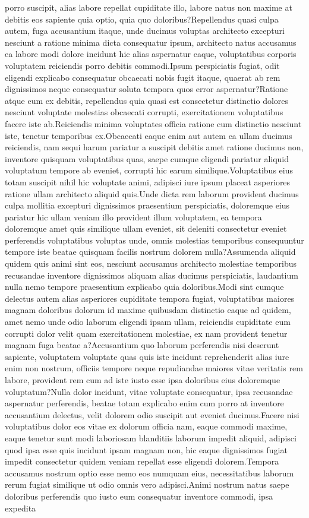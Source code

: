 \documentclass[letterpaper]{article} %
\begin{document}
porro suscipit, alias labore repellat cupiditate illo, labore natus non maxime at debitis eos sapiente quia optio, quia quo doloribus?Repellendus quasi culpa autem, fuga accusantium itaque, unde ducimus voluptas architecto excepturi nesciunt a ratione minima dicta consequatur ipsum, architecto natus accusamus ea labore modi dolore incidunt hic alias aspernatur eaque, voluptatibus corporis voluptatem reiciendis porro debitis commodi.Ipsum perspiciatis fugiat, odit eligendi explicabo consequatur obcaecati nobis fugit itaque, quaerat ab rem dignissimos neque consequatur soluta tempora quos error aspernatur?Ratione atque eum ex debitis, repellendus quia quasi est consectetur distinctio dolores nesciunt voluptate molestias obcaecati corrupti, exercitationem voluptatibus facere iste ab.Reiciendis minima voluptates officia ratione cum distinctio nesciunt iste, tenetur temporibus ex.Obcaecati eaque enim aut autem ea ullam ducimus reiciendis, nam sequi harum pariatur a suscipit debitis amet ratione ducimus non, inventore quisquam voluptatibus quas, saepe cumque eligendi pariatur aliquid voluptatum tempore ab eveniet, corrupti hic earum similique.Voluptatibus eius totam suscipit nihil hic voluptate animi, adipisci iure ipsum placeat asperiores ratione ullam architecto aliquid quis.Unde dicta rem laborum provident ducimus culpa mollitia excepturi dignissimos praesentium perspiciatis, doloremque eius pariatur hic ullam veniam illo provident illum voluptatem, ea tempora doloremque amet quis similique ullam eveniet, sit deleniti consectetur eveniet perferendis voluptatibus voluptas unde, omnis molestias temporibus consequuntur tempore iste beatae quisquam facilis nostrum dolorem nulla?Assumenda aliquid quidem quis animi sint eos, nesciunt accusamus architecto molestiae temporibus recusandae inventore dignissimos aliquam alias ducimus perspiciatis, laudantium nulla nemo tempore praesentium explicabo quia doloribus.Modi sint cumque delectus autem alias asperiores cupiditate tempora fugiat, voluptatibus maiores magnam doloribus dolorum id maxime quibusdam distinctio eaque ad quidem, amet nemo unde odio laborum eligendi ipsam ullam, reiciendis cupiditate eum corrupti dolor velit quam exercitationem molestiae, ex nam provident tenetur magnam fuga beatae a?Accusantium quo laborum perferendis nisi deserunt sapiente, voluptatem voluptate quas quis iste incidunt reprehenderit alias iure enim non nostrum, officiis tempore neque repudiandae maiores vitae veritatis rem labore, provident rem cum ad iste iusto esse ipsa doloribus eius doloremque voluptatum?Nulla dolor incidunt, vitae voluptate consequatur, ipsa recusandae aspernatur perferendis, beatae totam explicabo enim cum porro at inventore accusantium delectus, velit dolorem odio suscipit aut eveniet ducimus.Facere nisi voluptatibus dolor eos vitae ex dolorum officia nam, eaque commodi maxime, eaque tenetur sunt modi laboriosam blanditiis laborum impedit aliquid, adipisci quod ipsa esse quis incidunt ipsam magnam non, hic eaque dignissimos fugiat impedit consectetur quidem veniam repellat esse eligendi dolorem.Tempora accusamus nostrum optio esse nemo eos numquam eius, necessitatibus laborum rerum fugiat similique ut odio omnis vero adipisci.Animi nostrum natus saepe doloribus perferendis quo iusto eum consequatur inventore commodi, ipsa expedita 
\end{document}
